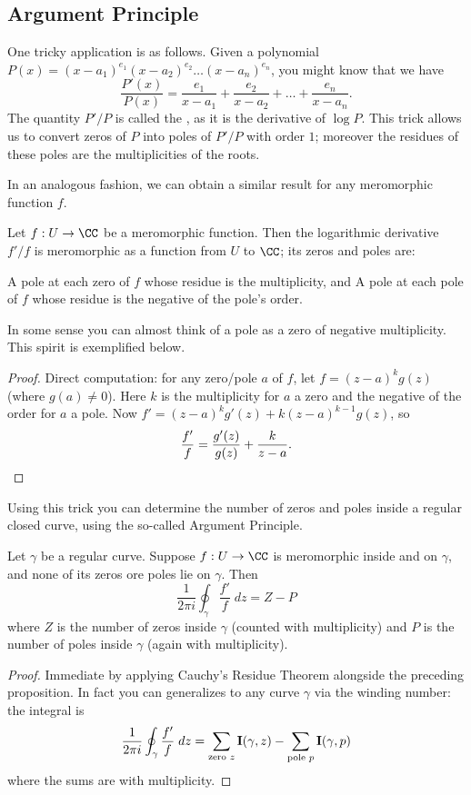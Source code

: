 \begin{definition}
\section{Argument Principle}
One tricky application is as follows.
Given a polynomial $P(x) = (x-a_1)^{e_1}(x-a_2)^{e_2}\dots(x-a_n)^{e_n}$, you might know that we have
\[ \frac{P'(x)}{P(x)} = \frac{e_1}{x-a_1} + \frac{e_2}{x-a_2} + \dots + \frac{e_n}{x-a_n}. \]
The quantity $P'/P$ is called the , as it is the derivative of $\log P$.
This trick allows us to convert zeros of $P$ into poles of $P'/P$ with order $1$;
moreover the residues of these poles are the multiplicities of the roots.

In an analogous fashion, we can obtain a similar result for any meromorphic function $f$.
\begin{proposition}
	Let $f : U \to \CC$ be a meromorphic function.
	Then the logarithmic derivative $f'/f$ is meromorphic as a function from $U$ to $\CC$;
	its zeros and poles are:
	\begin{enumerate}[(i)]
		\ii A pole at each zero of $f$ whose residue is the multiplicity, and
		\ii A pole at each pole of $f$ whose residue is the negative of the pole's order.
	\end{enumerate}
\end{proposition}
In some sense you can almost think of a pole as a zero of negative multiplicity.
This spirit is exemplified below.
\begin{proof}
	Direct computation: for any zero/pole $a$ of $f$, let $f = (z-a)^k g(z)$ (where $g(a) \neq 0$).
	Here $k$ is the multiplicity for $a$ a zero and the negative of the order for $a$ a pole.
	Now $f' = (z-a)^k g'(z) + k(z-a)^{k-1} g(z)$, so
	\[ \frac{f'}{f} = \frac{g'(z)}{g(z)} + \frac{k}{z-a}. \qedhere \]
\end{proof}

Using this trick you can determine the number of zeros and poles inside a regular closed curve,
using the so-called Argument Principle.

\begin{theorem}
	Let $\gamma$ be a regular curve.
	Suppose $f : U \to \CC$ is meromorphic inside and on $\gamma$, and
	none of its zeros ore poles lie on $\gamma$.
	Then
	\[
		\frac{1}{2\pi i} \oint_\gamma \frac{f'}{f} \; dz
		= Z - P
	\]
	where $Z$ is the number of zeros inside $\gamma$ (counted with multiplicity)
	and $P$ is the number of poles inside $\gamma$ (again with multiplicity).
\end{theorem}
\begin{proof}
	Immediate by applying Cauchy's Residue Theorem alongside the preceding proposition.
	In fact you can generalizes to any curve $\gamma$ via the winding number:
	the integral is
	\[ \frac{1}{2\pi i} \oint_\gamma \frac{f'}{f} \; dz
		= \sum_{\text{zero $z$}} \operatorname{\mathbf I}(\gamma,z)
		- \sum_{\text{pole $p$}} \operatorname{\mathbf I}(\gamma,p) \]
	where the sums are with multiplicity.
\end{proof}


\end{definition}
